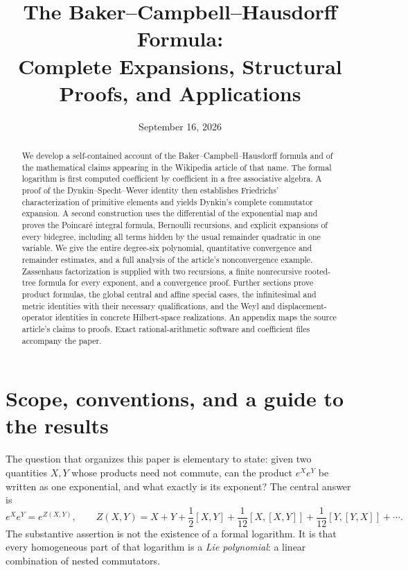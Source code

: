 \documentclass[11pt]{article}
\title{The Baker--Campbell--Hausdorff Formula:\\Complete Expansions, Structural Proofs, and Applications}
\author{}
\date{September 16, 2026}
\theoremstyle{definition}
\theoremstyle{remark}
\numberwithin{equation}{section}
\begin{document}
\maketitle
\begin{abstract}
We develop a self-contained account of the Baker--Campbell--Hausdorff formula and of the mathematical claims appearing in the Wikipedia article of that name. The formal logarithm is first computed coefficient by coefficient in a free associative algebra. A proof of the Dynkin--Specht--Wever identity then establishes Friedrichs' characterization of primitive elements and yields Dynkin's complete commutator expansion. A second construction uses the differential of the exponential map and proves the Poincar\'e integral formula, Bernoulli recursions, and explicit expansions of every bidegree, including all terms hidden by the usual remainder quadratic in one variable. We give the entire degree-six polynomial, quantitative convergence and remainder estimates, and a full analysis of the article's nonconvergence example. Zassenhaus factorization is supplied with two recursions, a finite nonrecursive rooted-tree formula for every exponent, and a convergence proof. Further sections prove product formulas, the global central and affine special cases, the infinitesimal and metric identities with their necessary qualifications, and the Weyl and displacement-operator identities in concrete Hilbert-space realizations. An appendix maps the source article's claims to proofs. Exact rational-arithmetic software and coefficient files accompany the paper.
\end{abstract}
\tableofcontents

\section{Scope, conventions, and a guide to the results}\label{sec:scope}
The question that organizes this paper is elementary to state: given two quantities $X,Y$ whose products need not commute, can the product $e^Xe^Y$ be written as one exponential, and what exactly is its exponent? The central answer is
\begin{equation}\label{eq:main}
 e^Xe^Y=e^{Z(X,Y)},\qquad
 Z(X,Y)=X+Y+\frac12[X,Y]+\frac1{12}[X,[X,Y]]
                  +\frac1{12}[Y,[Y,X]]+\cdots.
\end{equation}
The substantive assertion is not the existence of a formal logarithm. It is that every homogeneous part of that logarithm is a \emph{Lie polynomial}: a linear combination of nested commutators.
\end{document}
